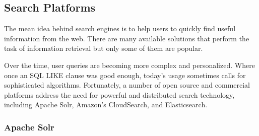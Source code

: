 
\subsection{Search Platforms \label{sec:back_se_en}}
The mean idea behind search engines is to help users to quickly find useful information from the web. There are many available solutions that  perform the task of information retrieval but only some of them are popular.

Over the time, user queries are becoming more complex and personalized. Where once an \ac{SQL} LIKE clause was good enough, today's usage sometimes calls for sophisticated algorithms. Fortunately, a number of open source and commercial platforms address the need for powerful and distributed search technology, including Apache Solr, Amazon's CloudSearch, and Elasticsearch.

\subsubsection{Apache Solr \label{sec:back_se_solr}}

